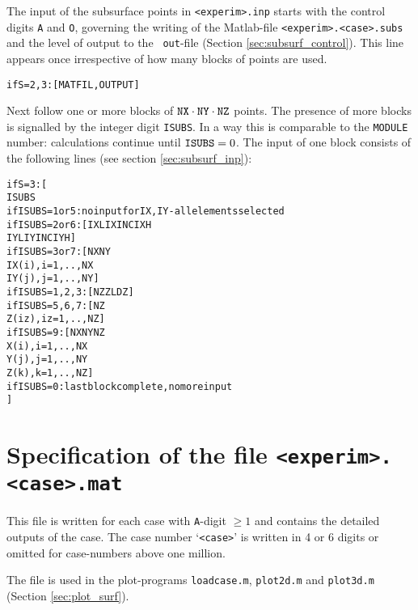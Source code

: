 \documentclass[12pt]{report}
\begin{document}
The input of the subsurface points in {\tt <experim>.inp} starts with the
control digits {\tt A} and {\tt O}, governing the writing of the
Matlab-file {\tt <experim>.<case>.subs} and the level of output to the {\tt
out}-file (Section \ref{sec:subsurf_control}). This line appears once
irrespective of how many blocks of points are used.
\begin{alltt}\small
    if S=2,3: [ MATFIL, OUTPUT ]
\end{alltt}
Next follow one or more blocks of ${\tt NX}\cdot{\tt NY}\cdot{\tt NZ}$
points. The presence of more blocks is signalled by the integer
digit {\tt ISUBS}. In a way this is comparable to the {\tt MODULE} number:
calculations continue until ${\tt ISUBS}=0$. The input of one block
consists of the following lines (see section \ref{sec:subsurf_inp}):
\begin{alltt}\small
    if S=3: [ 
       ISUBS
       if ISUBS=1 or 5:   no input for IX,IY - all elements selected
       if ISUBS=2 or 6: [ IXL IXINC IXH  
                          IYL IYINC IYH      ]
       if ISUBS=3 or 7: [ NX  NY
                          IX(i), i=1,..,NX
                          IY(j), j=1,..,NY   ]
       if ISUBS=1,2,3:  [ NZ  ZL  DZ         ]
       if ISUBS=5,6,7:  [ NZ
                          Z(iz), iz=1,..,NZ  ]
       if ISUBS=9:      [ NX  NY  NZ
                          X(i),  i=1,..,NX
                          Y(j),  j=1,..,NY
                          Z(k),  k=1,..,NZ   ]
       if ISUBS=0:      last block complete, no more input
    ]
\end{alltt}

\section{Specification of the file {\tt <experim>.<case>.mat}}
\label{sec:spec_mat}

This file is written for each case with {\tt A}-digit $\ge 1$ and contains
the detailed outputs of the case. The case number `{\tt <case>}' is
written in 4 or 6 digits or omitted for case-numbers above one million.

The file is used in the plot-programs {\tt loadcase.m}, {\tt plot2d.m} and
{\tt plot3d.m} (Section \ref{sec:plot_surf}).
\end{document}
